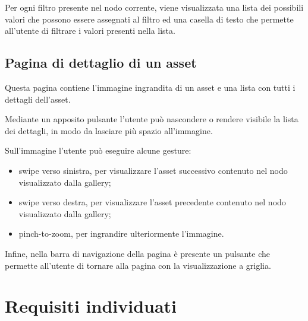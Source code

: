 Per ogni filtro presente nel nodo corrente, viene visualizzata una lista dei possibili valori che possono essere assegnati al filtro ed una casella di testo che permette all'utente di filtrare i valori presenti nella lista.

\subsection{Pagina di dettaglio di un asset}\label{sec:pag-dettaglio-asset}

Questa pagina contiene l'immagine ingrandita di un asset e una lista con tutti i dettagli dell'asset.

Mediante un apposito pulsante l'utente può nascondere o rendere visibile la lista dei dettagli, in modo da lasciare più spazio all'immagine.

Sull'immagine l'utente può eseguire alcune gesture:
\begin{itemize}
\item \gls{swipe} verso sinistra, per visualizzare l'asset successivo contenuto nel nodo visualizzato dalla gallery;
\item swipe verso destra, per visualizzare l'asset precedente contenuto nel nodo visualizzato dalla gallery;
\item pinch-to-zoom, per ingrandire ulteriormente l'immagine.
\end{itemize}

Infine, nella barra di navigazione della pagina è presente un pulsante che permette all'utente di tornare alla pagina con la visualizzazione a griglia.


\section{Requisiti individuati}

